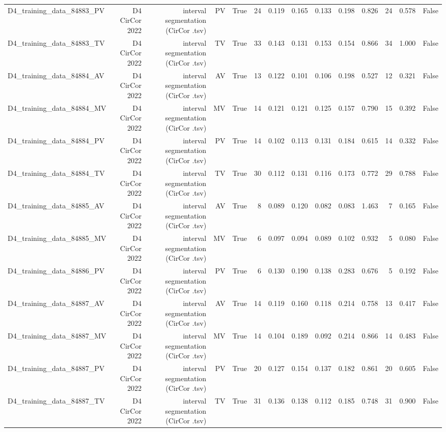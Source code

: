 \begin{table}[htbp]
\begin{tabular}{lrrrrrrrrrrrrr}
    D4\_training\_data\_84883\_PV & D4 CirCor 2022 & interval segmentation (CirCor .tsv) & PV & True & 24 & 0.119 & 0.165 & 0.133 & 0.198 & 0.826 & 24 & 0.578 & False \\
    D4\_training\_data\_84883\_TV & D4 CirCor 2022 & interval segmentation (CirCor .tsv) & TV & True & 33 & 0.143 & 0.131 & 0.153 & 0.154 & 0.866 & 34 & 1.000 & False \\
    D4\_training\_data\_84884\_AV & D4 CirCor 2022 & interval segmentation (CirCor .tsv) & AV & True & 13 & 0.122 & 0.101 & 0.106 & 0.198 & 0.527 & 12 & 0.321 & False \\
    D4\_training\_data\_84884\_MV & D4 CirCor 2022 & interval segmentation (CirCor .tsv) & MV & True & 14 & 0.121 & 0.121 & 0.125 & 0.157 & 0.790 & 15 & 0.392 & False \\
    D4\_training\_data\_84884\_PV & D4 CirCor 2022 & interval segmentation (CirCor .tsv) & PV & True & 14 & 0.102 & 0.113 & 0.131 & 0.184 & 0.615 & 14 & 0.332 & False \\
    D4\_training\_data\_84884\_TV & D4 CirCor 2022 & interval segmentation (CirCor .tsv) & TV & True & 30 & 0.112 & 0.131 & 0.116 & 0.173 & 0.772 & 29 & 0.788 & False \\
    D4\_training\_data\_84885\_AV & D4 CirCor 2022 & interval segmentation (CirCor .tsv) & AV & True & 8 & 0.089 & 0.120 & 0.082 & 0.083 & 1.463 & 7 & 0.165 & False \\
    D4\_training\_data\_84885\_MV & D4 CirCor 2022 & interval segmentation (CirCor .tsv) & MV & True & 6 & 0.097 & 0.094 & 0.089 & 0.102 & 0.932 & 5 & 0.080 & False \\
    D4\_training\_data\_84886\_PV & D4 CirCor 2022 & interval segmentation (CirCor .tsv) & PV & True & 6 & 0.130 & 0.190 & 0.138 & 0.283 & 0.676 & 5 & 0.192 & False \\
    D4\_training\_data\_84887\_AV & D4 CirCor 2022 & interval segmentation (CirCor .tsv) & AV & True & 14 & 0.119 & 0.160 & 0.118 & 0.214 & 0.758 & 13 & 0.417 & False \\
    D4\_training\_data\_84887\_MV & D4 CirCor 2022 & interval segmentation (CirCor .tsv) & MV & True & 14 & 0.104 & 0.189 & 0.092 & 0.214 & 0.866 & 14 & 0.483 & False \\
    D4\_training\_data\_84887\_PV & D4 CirCor 2022 & interval segmentation (CirCor .tsv) & PV & True & 20 & 0.127 & 0.154 & 0.137 & 0.182 & 0.861 & 20 & 0.605 & False \\
    D4\_training\_data\_84887\_TV & D4 CirCor 2022 & interval segmentation (CirCor .tsv) & TV & True & 31 & 0.136 & 0.138 & 0.112 & 0.185 & 0.748 & 31 & 0.900 & False \\

\end{tabular}
\end{table}
